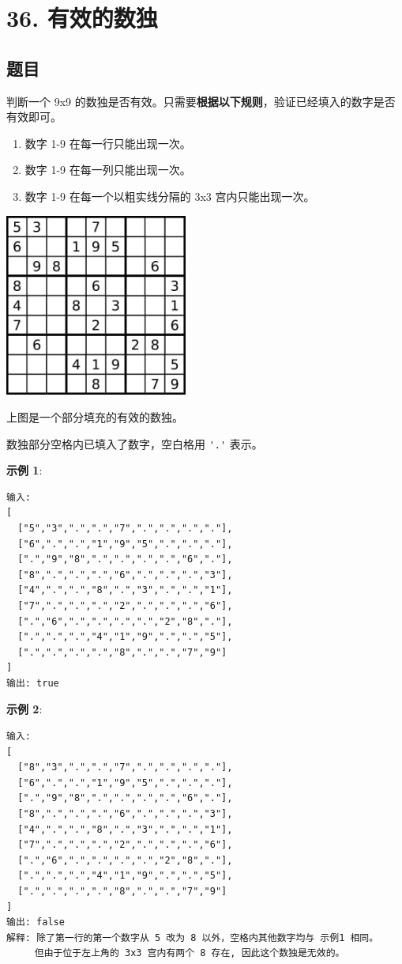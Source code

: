 \newpage
\section{36. 有效的数独}
\label{leetcode:36}

\subsection{题目}

判断一个 9x9 的数独是否有效。只需要\textbf{根据以下规则}，验证已经填入的数字是否有效即可。

\begin{enumerate}
  \item 数字 1-9 在每一行只能出现一次。
  \item 数字 1-9 在每一列只能出现一次。
  \item 数字 1-9 在每一个以粗实线分隔的 3x3 宫内只能出现一次。
\end{enumerate}

\includegraphics[width=60mm,height=60mm]{images/leetcode/36_sudo.jpg}

上图是一个部分填充的有效的数独。

数独部分空格内已填入了数字，空白格用 \verb|'.'| 表示。

\textbf{示例 1}:

\begin{verbatim}
输入:
[
  ["5","3",".",".","7",".",".",".","."],
  ["6",".",".","1","9","5",".",".","."],
  [".","9","8",".",".",".",".","6","."],
  ["8",".",".",".","6",".",".",".","3"],
  ["4",".",".","8",".","3",".",".","1"],
  ["7",".",".",".","2",".",".",".","6"],
  [".","6",".",".",".",".","2","8","."],
  [".",".",".","4","1","9",".",".","5"],
  [".",".",".",".","8",".",".","7","9"]
]
输出: true
\end{verbatim}

\textbf{示例 2}:

\begin{verbatim}
输入:
[
  ["8","3",".",".","7",".",".",".","."],
  ["6",".",".","1","9","5",".",".","."],
  [".","9","8",".",".",".",".","6","."],
  ["8",".",".",".","6",".",".",".","3"],
  ["4",".",".","8",".","3",".",".","1"],
  ["7",".",".",".","2",".",".",".","6"],
  [".","6",".",".",".",".","2","8","."],
  [".",".",".","4","1","9",".",".","5"],
  [".",".",".",".","8",".",".","7","9"]
]
输出: false
解释: 除了第一行的第一个数字从 5 改为 8 以外，空格内其他数字均与 示例1 相同。
     但由于位于左上角的 3x3 宫内有两个 8 存在, 因此这个数独是无效的。
\end{verbatim}

